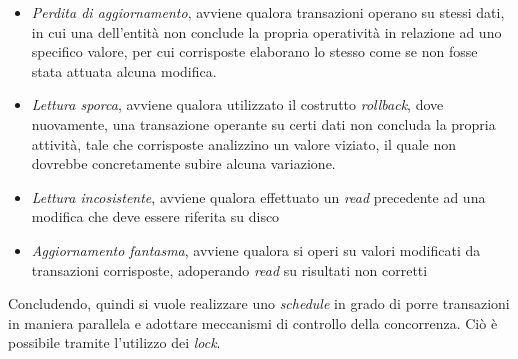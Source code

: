 \documentclass{article}
\begin{document}
\begin{itemize}[label={-}]
    \itemsep0em
    \item \textit{Perdita di aggiornamento}, avviene qualora transazioni operano su stessi dati, in cui una dell'entità non conclude la propria operatività in relazione ad uno specifico valore, per cui corrisposte elaborano lo stesso come se non fosse stata attuata alcuna modifica.
    \item \textit{Lettura sporca}, avviene qualora utilizzato il costrutto \textit{rollback}, dove nuovamente, una transazione operante su certi dati non concluda la propria attività, tale che corrisposte analizzino un valore viziato, il quale non dovrebbe concretamente subire alcuna variazione.
    \item \textit{Lettura incosistente}, avviene qualora effettuato un \textit{read} precedente ad una modifica che deve essere riferita su disco
    \item \textit{Aggiornamento fantasma}, avviene qualora si operi su valori modificati da transazioni corrisposte, adoperando \textit{read} su risultati non corretti  
\end{itemize}
Concludendo, quindi si vuole realizzare uno \textit{schedule} in grado di porre transazioni in maniera parallela e adottare meccanismi di controllo della concorrenza. Ciò è possibile tramite l'utilizzo dei \textit{lock}.
\end{document}
